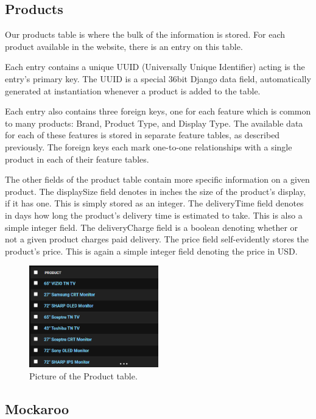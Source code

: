 \documentclass[sigconf]{acmart}
\begin{document}
\subsection{Products}
Our products table is where the bulk of the information is stored. For each product available in the website, there is an entry on this table. \par
Each entry contains a unique UUID (Universally Unique Identifier) acting is the entry's primary key. The UUID is a special 36bit Django data field, automatically generated at instantiation whenever a product is added to the table. \par
Each entry also contains three foreign keys, one for each feature which is common to many products: Brand, Product Type, and Display Type. The available data for each of these features is stored in separate feature tables, as described previously. The foreign keys each mark one-to-one relationships with a single product in each of their feature tables. \par
The other fields of the product table contain more specific information on a given product. The displaySize field denotes in inches the size of the product's display, if it has one. This is simply stored as an integer. The deliveryTime field denotes in days how long the product's delivery time is estimated to take. This is also a simple integer field. The deliveryCharge field is a boolean denoting whether or not a given product charges paid delivery. The price field self-evidently stores the product's price. This is again a simple integer field denoting the price in USD.


\begin{figure}[H] %
	\centering %
	\includegraphics[width=0.5\textwidth]{Figures/product.png} %
	\caption{Picture of the Product table.}
\end{figure}

\subsection{Mockaroo}
\end{document}
